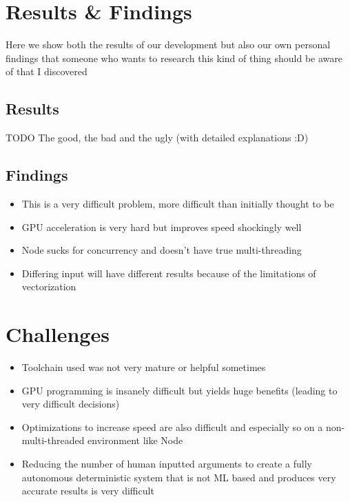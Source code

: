 \documentclass[14pt]{article}
\begin{document}
    \section{Results \& Findings}

    Here we show both the results of our development but also our own personal findings that someone who
    wants to research this kind of thing should be aware of that I discovered

    \subsection{Results}

    TODO
    \linebreak
    The good, the bad and the ugly (with detailed explanations :D)

    \subsection{Findings}

    \begin{itemize}
        \item This is a very difficult problem, more difficult than initially thought to be
        \item GPU acceleration is very hard but improves speed shockingly well
        \item Node sucks for concurrency and doesn't have true multi-threading
        \item Differing input will have different results because of the limitations of vectorization
    \end{itemize}


    \section{Challenges}

    \begin{itemize}
        \item Toolchain used was not very mature or helpful sometimes
        \item GPU programming is insanely difficult but yields huge benefits (leading to very difficult decisions)
        \item Optimizations to increase speed are also difficult and especially so on a non-multi-threaded environment like Node
        \item Reducing the number of human inputted arguments to create a fully autonomous deterministic system that is not ML based and produces very accurate results is very difficult
    \end{itemize}
\end{document}
